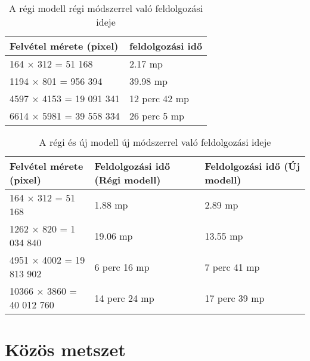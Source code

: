 \begin{table}[H]
	\centering
	\begin{tabular}{ | p{} | p{} | }
		\hline
		\textbf{Felvétel mérete (pixel)} & \textbf{feldolgozási idő} \\
		\hline \hline
		164 × 312 = 51 168  & 2.17 mp  \\
		\hline
		1194 × 801 = 956 394 & 39.98 mp\\
		\hline
		4597 × 4153 = 19 091 341 & 12 perc 42 mp \\
		\hline
        6614 × 5981 = 39 558 334 & 26 perc 5 mp  \\
		\hline
	\end{tabular}
	\caption{A régi modell régi módszerrel való feldolgozási ideje}
	\label{tab:old-speed}
\end{table}

\begin{table}[H]
	\centering
	\begin{tabular}{ | p{} | p{} | p{} }
		\hline
		\textbf{Felvétel mérete (pixel)} & \textbf{Feldolgozási idő (Régi modell)} & \textbf{Feldolgozási idő (Új modell)} \\
		\hline \hline
		164 × 312 = 51 168  & 1.88 mp &  2.89 mp \\
		\hline
		1262 × 820 = 1 034 840 & 19.06 mp & 13.55 mp \\
		\hline
		4951 × 4002 = 19 813 902 & 6 perc 16 mp & 7 perc 41 mp \\
		\hline
        10366 × 3860 = 40 012 760 & 14 perc 24 mp & 17 perc 39 mp \\
		\hline
	\end{tabular}
	\caption{A régi és új modell új módszerrel való feldolgozási ideje}
	\label{tab:new-speed}
\end{table}

\section{Közös metszet}
\label{ch:intersection}

